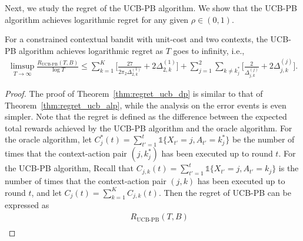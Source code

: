 Next, we study the regret of the UCB-PB algorithm.  We  show that the UCB-PB algorithm achieves logarithmic regret for any given $\rho \in (0,1)$.
\begin{theorem}\label{thm:regret_ucb_dp}
For a constrained contextual bandit with unit-cost and two contexts, the UCB-PB algorithm achieves  logarithmic regret as $T$ goes to infinity, i.e.,
\begin{eqnarray}
\limsup_{T \to \infty} \frac{R_{\text{UCB-PB}}(T, B)}{\log T} \leq \sum_{k=1}^K \bigg[\frac{27}{2\pi_2\Delta^{(1)}_{2,k}} + 2\Delta^{(1)}_{2,k} \bigg] + \sum_{j=1}^2 \sum_{k \neq k_j^*}\bigg[\frac{2}{\Delta_{j,k}^{(j)}} + 2\Delta_{j,k}^{(j)}\bigg]. \nonumber
\end{eqnarray}
\end{theorem}
\begin{proof}
The proof of Theorem~\ref{thm:regret_ucb_dp} is similar to that of Theorem~\ref{thm:regret_ucb_alp}, while the analysis on the error events is even simpler.
Note that the regret is defined as the difference between the expected total rewards achieved by the UCB-PB algorithm and the oracle algorithm. For the oracle algorithm, let $C_j^*(t) = \sum_{t' = 1}^t \mathds{1}\{X_{t'} = j, A_{t'} = k_j^*\}$ be the number of times that the context-action pair $(j, k_j^*)$ has been executed up to round $t$. For the UCB-PB algorithm, Recall that $C_{j,k}(t) = \sum_{t' = 1}^t \mathds{1}\{X_{t'} = j, A_{t'} = k_j\}$ is the number of times that the context-action pair $(j,k)$ has been executed up to round $t$, and let $C_j(t) = \sum_{k=1}^K C_{j,k}(t)$.
Then the regret of UCB-PB can be expressed as
\begin{eqnarray} \label{eq:regret_ucb_dp_details}
&&R_{\text{UCB-PB}}(T, B) \nonumber \\

\end{eqnarray}
\end{proof}
